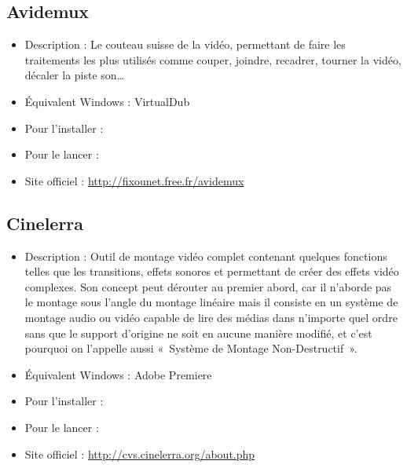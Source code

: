 \subsection{Avidemux}
\begin{itemize}
\begingroup
{}
\item Description : Le couteau suisse de la vidéo, permettant de faire les traitements les plus utilisés comme couper, joindre, recadrer, tourner la vidéo, décaler la piste son\ldots{}{\par}
\item Équivalent Windows : VirtualDub{\par}
\item Pour l'installer : 
\item Pour le lancer : 
\item Site officiel : \url{http://fixounet.free.fr/avidemux}{\par}
\endgroup
\end{itemize}
\subsection{Cinelerra}
\begin{itemize}
\begingroup
{}
\item Description : Outil de montage vidéo complet contenant quelques fonctions telles que les transitions, effets sonores et permettant de créer des effets vidéo complexes. Son concept peut dérouter au premier abord, car il n'aborde pas le montage sous l'angle du montage linéaire mais il consiste en un système de montage audio ou vidéo capable de lire des médias dans n'importe quel ordre sans que le support d'origine ne soit en aucune manière modifié, et c'est pourquoi on l'appelle aussi «~Système de Montage Non-Destructif~».{\par}
\endgroup
\item Équivalent Windows : Adobe Premiere{\par}
\item Pour l'installer : 
\item Pour le lancer : 
\item Site officiel : \url{http://cvs.cinelerra.org/about.php}{\par}
\end{itemize}
